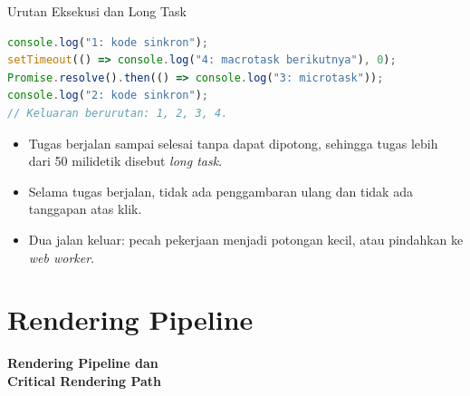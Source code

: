 \documentclass[aspectratio=169, table, 12pt]{beamer}
\begin{document}
\begin{frame}[fragile]{{\Large Urutan Eksekusi dan Long Task}}
  \vspace{3pt}
\begin{lstlisting}[language=TypeScript]
console.log("1: kode sinkron");
setTimeout(() => console.log("4: macrotask berikutnya"), 0);
Promise.resolve().then(() => console.log("3: microtask"));
console.log("2: kode sinkron");
// Keluaran berurutan: 1, 2, 3, 4.
\end{lstlisting}

  \vspace{3pt}
  \begin{itemize}
    \item Tugas berjalan sampai selesai tanpa dapat dipotong, sehingga tugas
          lebih dari 50 milidetik disebut \textit{long task}.
    \item Selama tugas berjalan, tidak ada penggambaran ulang dan tidak ada
          tanggapan atas klik.
    \item Dua jalan keluar: pecah pekerjaan menjadi potongan kecil, atau
          pindahkan ke \textit{web worker}.
  \end{itemize}
\end{frame}

\section{Rendering Pipeline}

\begin{frame}{\hfill}
  \centering
  \Huge{\textbf{Rendering Pipeline dan\\Critical Rendering Path}}
\end{frame}
\end{document}
